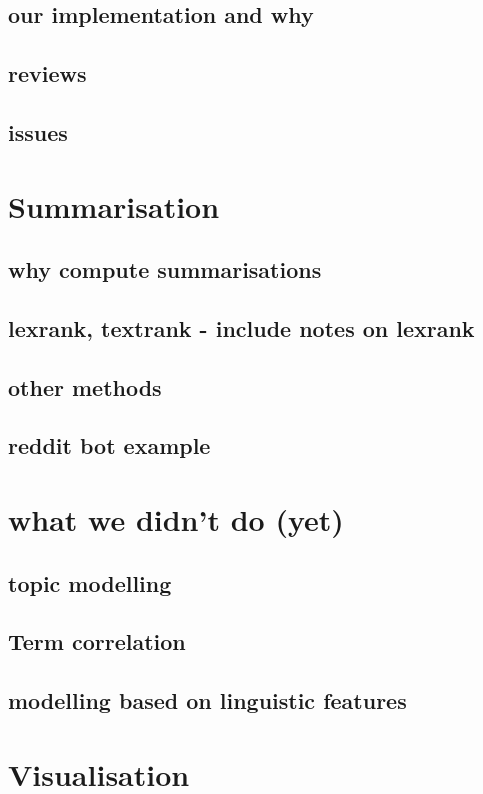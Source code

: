 \documentclass[11pt, a4paper, oneside]{report}
\begin{document}
\subsection{our implementation and why}
\subsection{reviews}
\subsection{issues}

\section{Summarisation}
\label{sec:summarisation}

\subsection{why compute summarisations}
\subsection{lexrank, textrank - include notes on lexrank}
\subsection{other methods}
\subsection{reddit bot example}

\section{what we didn't do (yet)}
\label{sec:what-we-didnt}

\subsection{topic modelling}
\subsection{Term correlation}
\subsection{modelling based on linguistic features}

\section{Visualisation}
\label{sec:visualisation-1}
\end{document}
